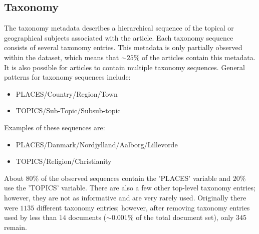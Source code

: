\subsection{Taxonomy}\label{sec:dataset_taxonomy}
The taxonomy metadata describes a hierarchical sequence of the topical or geographical subjects associated with the article.
Each taxonomy sequence consists of several taxonomy entries.
This metadata is only partially observed within the dataset, which means that ${\sim}25\%$ of the articles contain this metadata.
It is also possible for articles to contain multiple taxonomy sequences.
General patterns for taxonomy sequences include:
\begin{itemize}
	\item PLACES/Country/Region/Town
	\item TOPICS/Sub-Topic/Subsub-topic
\end{itemize}
Examples of these sequences are:
\begin{itemize}
	\item PLACES/Danmark/Nordjylland/Aalborg/Lillevorde
	\item TOPICS/Religion/Christianity
\end{itemize}
About $80\%$ of the observed sequences contain the 'PLACES' variable and $20\%$ use the 'TOPICS' variable.
There are also a few other top-level taxonomy entries; however, they are not as informative and are very rarely used.
Originally there were $1135$ different taxonomy entries; however, after removing taxonomy entries used by less than $14$ documents (${\sim}0.001\%$ of the total document set), only $345$ remain.
